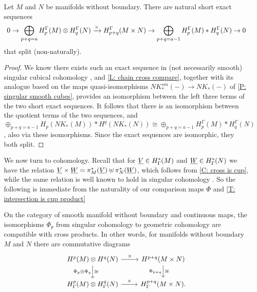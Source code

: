 \begin{theorem}\label{T: homology kunneth}
	Let $M$ and $N$ be manifolds without boundary.
	There are natural short exact sequences
	\[
	0 \to \bigoplus_{p+q = a} H_p^\Gamma(M) \otimes H_q^\Gamma(N) \xrightarrow{\times} H_{p+q}^\Gamma(M \times N) \to \bigoplus_{p+q = a-1} H_p^\Gamma(M)* H_q^\Gamma(N) \to 0
	\]
	that split (non-naturally).
\end{theorem}

\begin{proof}
	We know there exists such an exact sequence in (not necessarily smooth) singular cubical cohomology \cite[Chapter XI]{Mas91}, and \cref{L: chain cross compare}, together with its analogue based on the maps quasi-isomorphisms $NK^{sm}_*(-) \to NK_*(-)$
	of \cref{P: singular smooth cubes}, provides an isomorphism between the left three terms of the two short exact sequences.
	It follows that there is an isomorphism between the quotient terms of the two sequences, and $\oplus_{p+q = a-1}H_p(NK_*(M))* H^q(NK_*(N)) \cong \oplus_{p+q = a-1}H_p^\Gamma(M)* H_q^\Gamma(N)$, also via these isomorphisms.
	Since the exact sequences are isomorphic, they both split.
\end{proof}

We now turn to cohomology.
Recall that for $\underline{V} \in H^*_\Gamma(M)$ and $\underline{W} \in H^*_\Gamma(N)$ we have the relation
$\underline{V} \times \underline{W} = \pi_M^*(\underline{V})\uplus\pi_N^*(\underline{W})$, which follows from \cref{C: cross is cup}, while the same relation is well known to hold in singular cohomology \cite[Corollary 5.6.14]{Span81}.
So the following is immediate from the naturality of our comparison maps $\Phi$ and \cref{T: intersection is cup product}

\begin{proposition}\label{P: cross product is cross product}
	On the category of smooth manifold without boundary and continuous maps, the isomorphisms $\Phi_p$ from singular cohomology to geometric cohomology are compatible with cross products.
	In other words, for manifolds without boundary $M$ and $N$ there are commutative diagrams
	\[
	\begin{tikzcd}
		H^p(M) \otimes H^q(N) \arrow{r}{\times} \arrow[d,"\Phi_p \otimes \Phi_q"', "\cong"] &
		H^{p+q}(M \times N) \arrow[d, "\Phi_{p+q}"', "\cong"] \\
		H^p_\Gamma(M) \otimes H^q_\Gamma(N) \arrow{r}{\times} &
		H^{p+q}_\Gamma(M \times N).
	\end{tikzcd}
	\]
\end{proposition}

